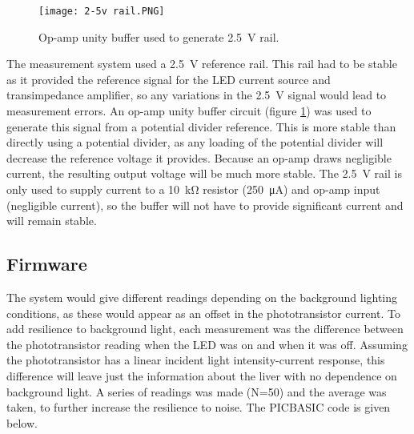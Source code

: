 \begin{figure}[htb]
	\centering
	\texttt{[image: 2-5v rail.PNG]}
	\caption{Op-amp unity buffer used to generate \SI{2.5}{\volt} rail.}
	\label{fig: 2.5v rail}
\end{figure}

The measurement system used a \SI{2.5}{\volt} reference rail. This rail had to be stable as it provided the reference signal for the LED current source and transimpedance amplifier, so any variations in the \SI{2.5}{\volt} signal would lead to measurement errors. An op-amp unity buffer circuit (figure \ref{fig: 2.5v rail}) was used to generate this signal from a potential divider reference. This is more stable than directly using a potential divider, as any loading of the potential divider will decrease the reference voltage it provides. Because an op-amp draws negligible current, the resulting output voltage will be much more stable. The \SI{2.5}{\volt} rail is only used to supply current to a \SI{10}{\kilo\ohm} resistor (\SI{250}{\micro\ampere}) and op-amp input (negligible current), so the buffer will not have to provide significant current and will remain stable.\\




\subsection{Firmware}
The system would give different readings depending on the background lighting conditions, as these would appear as an offset in the phototransistor current. To add resilience to background light, each measurement was the difference between the phototransistor reading when the LED was on and when it was off. Assuming the phototransistor has a linear incident light intensity-current response, this difference will leave just the information about the liver with no dependence on background light. A series of readings was made (N=50) and the average was taken, to further increase the resilience to noise. The PICBASIC code is given below.

